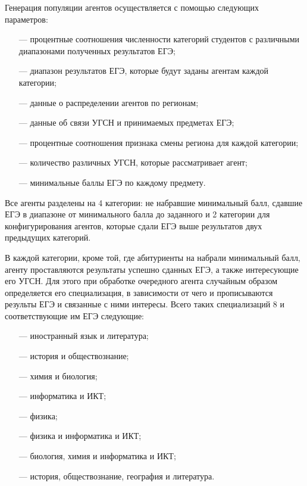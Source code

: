 Генерация популяции агентов осуществляется с помощью следующих параметров:

\begin{itemize}[leftmargin=1.6\parindent]
	\item[---] процентные соотношения численности категорий студентов с различными диапазонами полученных результатов ЕГЭ;
	\item[---] диапазон результатов ЕГЭ, которые будут заданы агентам каждой категории;
	\item[---] данные о распределении агентов по регионам;
	\item[---] данные об связи УГСН и принимаемых предметах ЕГЭ;
	\item[---] процентные соотношения признака смены региона для каждой категории;
	\item[---] количество различных УГСН, которые рассматривает агент;
	\item[---] минимальные баллы ЕГЭ по каждому предмету.
\end{itemize}

Все агенты разделены на 4 категории: не набравшие минимальный балл, сдавшие ЕГЭ в диапазоне от минимального балла до заданного и 2 категории для конфигурирования агентов, которые сдали ЕГЭ выше результатов двух предыдущих категорий.

В каждой категории, кроме той, где абитуриенты на набрали минимальный балл, агенту проставляются результаты успешно сданных ЕГЭ, а также интересующие его УГСН. Для этого при обработке очередного агента случайным образом определяется его специализация, в зависимости от чего и прописываются результы ЕГЭ и связанные с ними интересы. Всего таких специализаций 8 и соответствующие им ЕГЭ следующие:

\begin{itemize}[leftmargin=1.6\parindent]
	\item[---] иностранный язык и литература;
	\item[---] история и обществознание;
	\item[---] химия и биология;
	\item[---] информатика и ИКТ;
	\item[---] физика;
	\item[---] физика и информатика и ИКТ;
	\item[---] биология, химия и информатика и ИКТ;
	\item[---] история, обществознание, география и литература.
\end{itemize}

